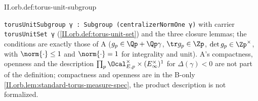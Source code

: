 \begin{definition}
\end{definition}
\begin{tfformal}{II.orb.def:torus-unit-subgroup}
\begin{tffidelity}
\texttt{torusUnitSubgroup γ : Subgroup (centralizerNormOne γ)} with carrier \texttt{torusUnitSet γ} (\cref{II.orb.def:torus-unit-set}) and the three closure lemmas; the conditions are exactly those of A ($g_p\in\Qp+\Qp\gamma$, $\tr g_p\in\Zp$, $\det g_p\in\Zp^\times$, with $\norm{\cdot}\le1$ and $\norm{\cdot}=1$ for integrality and unit). A's compactness, openness and the description $\prod_p\Ocal_{E,p}^\times\times(E_\infty^\times)^1$ for $\Delta(\gamma)<0$ are not part of the definition; compactness and openness are in the B-only \cref{II.orb.lem:standard-torus-measure-spec}, the product description is not formalized.
\end{tffidelity}
\end{tfformal}

